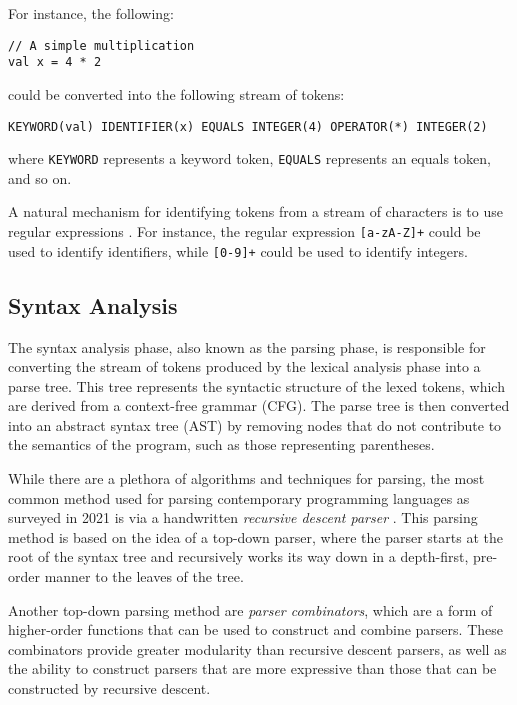 For instance, the following:

\begin{verbatim}
// A simple multiplication
val x = 4 * 2
\end{verbatim}

\noindent could be converted into the following stream of tokens:

\begin{verbatim}
KEYWORD(val) IDENTIFIER(x) EQUALS INTEGER(4) OPERATOR(*) INTEGER(2)
\end{verbatim}

\noindent where \texttt{KEYWORD} represents a keyword token,
\texttt{EQUALS} represents an equals token, and so on.

A natural mechanism for identifying tokens from a stream of characters is to use regular expressions
\autocite{aho2007compilers}. For instance, the regular expression \texttt{[a-zA-Z]+}
could be used to identify identifiers, while \texttt{[0-9]+} could be used to identify
integers.

\subsection{Syntax Analysis}

The syntax analysis phase, also known as the parsing phase, is responsible for converting the stream
of tokens produced by the lexical analysis phase into a parse tree. This tree represents the
syntactic structure of the lexed tokens, which are derived from a context-free grammar (CFG).
The parse tree is then converted into an abstract syntax tree (AST) by removing nodes that do not
contribute to the semantics of the program, such as those representing parentheses.

While there are a plethora of algorithms and techniques for parsing, the most common method used for
parsing contemporary programming languages as surveyed in 2021 is via a handwritten \emph{recursive
    descent parser} \autocite{eaton2021parser}. This parsing method is based on the idea of a top-down
parser, where the parser starts at the root of the syntax tree and recursively works its way down in
a depth-first, pre-order manner to the leaves of the tree.

Another top-down parsing method are \emph{parser combinators}, which are a form of higher-order
functions that can be used to construct and combine parsers. These combinators provide greater
modularity than recursive descent parsers, as well as the ability to construct parsers that are more
expressive than those that can be constructed by recursive descent.

